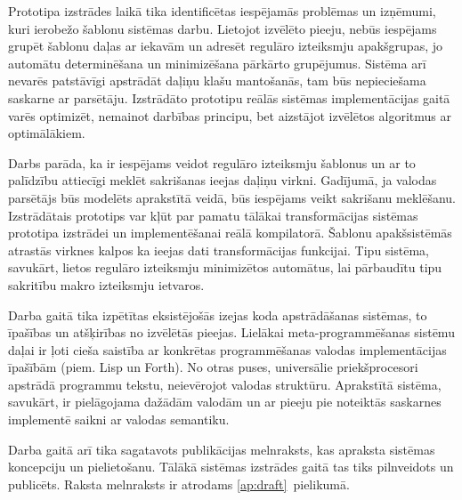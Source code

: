 Prototipa izstrādes laikā tika identificētas iespējamās problēmas un izņēmumi, kuri ierobežo šablonu sistēmas darbu. Lietojot izvēlēto pieeju, nebūs iespējams grupēt šablonu daļas ar iekavām un adresēt regulāro izteiksmju apakšgrupas, jo automātu determinēšana un minimizēšana pārkārto grupējumus. Sistēma arī nevarēs patstāvīgi apstrādāt daļiņu klašu mantošanās, tam būs nepieciešama saskarne ar parsētāju. Izstrādāto prototipu reālās sistēmas implementācijas gaitā varēs optimizēt, nemainot darbības principu, bet aizstājot izvēlētos algoritmus ar optimālākiem.

Darbs parāda, ka ir iespējams veidot regulāro izteiksmju šablonus un ar to palīdzību attiecīgi meklēt sakrišanas ieejas daļiņu virkni. Gadījumā, ja valodas parsētājs būs modelēts aprakstītā veidā, būs iespējams veikt sakrišanu meklēšanu. Izstrādātais prototips var kļūt par pamatu tālākai transformācijas sistēmas prototipa izstrādei un implementēšanai reālā kompilatorā. Šablonu apakšsistēmās atrastās virknes kalpos ka ieejas dati transformācijas funkcijai. Tipu sistēma, savukārt, lietos regulāro izteiksmju minimizētos automātus, lai pārbaudītu tipu sakritību makro izteiksmju ietvaros.

Darba gaitā tika izpētītas eksistējošās izejas koda apstrādāšanas sistēmas, to īpašības un atšķirības no izvēlētās pieejas. Lielākai meta-programmēšanas sistēmu daļai ir ļoti cieša saistība ar konkrētas programmēšanas valodas implementācijas īpašībām (piem. Lisp un Forth). No otras puses, universālie priekšprocesori apstrādā programmu tekstu, neievērojot valodas struktūru. Aprakstītā sistēma, savukārt, ir pielāgojama dažādām valodām un ar pieeju pie noteiktās saskarnes implementē saikni ar valodas semantiku.

Darba gaitā arī tika sagatavots publikācijas melnraksts, kas apraksta sistēmas koncepciju un pielietošanu. Tālākā sistēmas izstrādes gaitā tas tiks pilnveidots un publicēts. Raksta melnraksts ir atrodams \ref{ap:draft}~pielikumā.